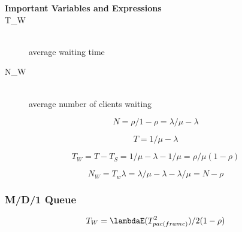 \documentclass[../resumosRCOM.tex]{subfiles}
\begin{document}
\begin{description}
    \item [\textbf{Important Variables and Expressions}]
    \item[T_{W}] \hfill \\ average waiting time
    \item[N_{W}] \hfill \\ average number of clients waiting
\end{description}

\begin{equation}
    N = \rho/1-\rho = \lambda/\mu-\lambda
\end{equation}

\begin{equation}
    T = 1/\mu-\lambda
\end{equation}

\begin{equation}
    T_{W} = T - T_{S} = 1/\mu-\lambda - 1/\mu = \rho/\mu(1-\rho)
\end{equation}

\begin{equation}
    N_{W} = T_{w}\lambda = \lambda/\mu-\lambda - \lambda/\mu = N - \rho
\end{equation}

\subsubsection{M/D/1 Queue}

\begin{equation}
    T_{W} = \lambdaE(T_{pac(frame)}^2)/2(1-\rho)
\end{equation}
\end{document}
